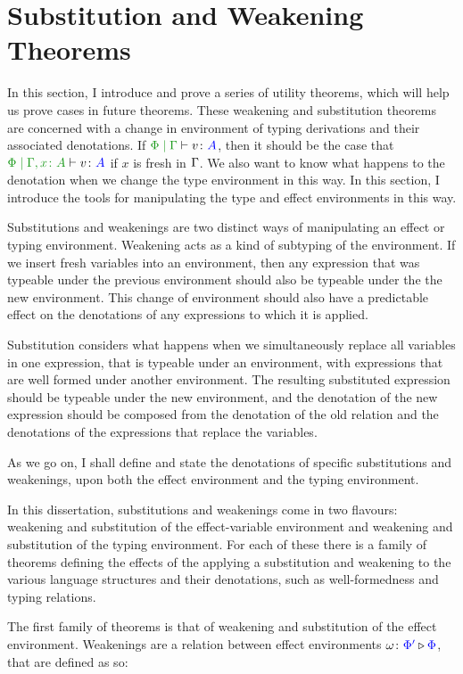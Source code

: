 \documentclass{Report}
\begin{document}
\section{Substitution and Weakening Theorems}\label{SubsAndWeakening}

In this section, I introduce and prove a series of utility theorems, which will help us prove cases in future theorems. These weakening and substitution theorems are concerned with a change in environment of typing derivations and their associated denotations. If $\gpetyperelation{v}{A}$, then it should be the case that $\etyperelation{\P}{\gax}{v}{A}$ if $x$ is fresh in $\Gamma$. We also want to know what happens to the denotation when we change the type environment in this way. In this section, I introduce the tools for manipulating the type and effect environments in this way.

Substitutions and weakenings are two distinct ways of manipulating an effect or typing environment. Weakening acts as a kind of subtyping of the environment. If we insert fresh variables into an environment, then any expression that was typeable under the previous environment should also be typeable under the the new environment. This change of environment should also have a predictable effect on the denotations of any expressions to which it is applied.

Substitution considers what happens when we simultaneously replace all variables in one expression, that is typeable under an environment, with expressions that are well formed under another environment. The resulting substituted expression should be typeable under the new environment, and the denotation of the new expression should be composed from the denotation of the old relation and the denotations of the expressions that replace the variables. 

As we go on, I shall define and state the denotations of specific substitutions and weakenings, upon both the effect environment and the typing environment.

In this dissertation, substitutions and weakenings come in two flavours: weakening and substitution of the effect-variable environment and weakening and substitution of the typing environment. For each of these there is a family of theorems defining the effects of the applying a substitution and weakening to the various language structures and their denotations, such as well-formedness and typing relations.


The first family of theorems is that of weakening and substitution of the effect environment. Weakenings are a relation between effect environments $\omega \colon {\color{blue}\Phi'} \triangleright {\color {blue} \Phi}$, that are defined as so:
\end{document}
